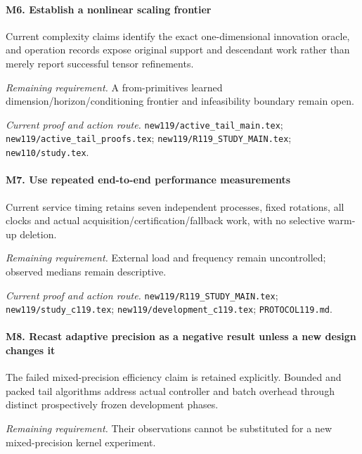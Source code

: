 \paragraph{M6. Establish a nonlinear scaling frontier}

Current complexity claims identify the exact one-dimensional innovation oracle, and operation records expose original support and descendant work rather than merely report successful tensor refinements.

\par\emph{Remaining requirement.} A from-primitives learned dimension/\allowbreak{}horizon/\allowbreak{}conditioning frontier and infeasibility boundary remain open.

\par\emph{Current proof and action route.} \nolinkurl{new119/active_tail_main.tex}; \nolinkurl{new119/active_tail_proofs.tex}; \nolinkurl{new119/R119_STUDY_MAIN.tex}; \nolinkurl{new110/study.tex}.

\paragraph{M7. Use repeated end-to-end performance measurements}

Current service timing retains seven independent processes, fixed rotations, all clocks and actual acquisition/\allowbreak{}certification/\allowbreak{}fallback work, with no selective warm-up deletion.

\par\emph{Remaining requirement.} External load and frequency remain uncontrolled; observed medians remain descriptive.

\par\emph{Current proof and action route.} \nolinkurl{new119/R119_STUDY_MAIN.tex}; \nolinkurl{new119/study_c119.tex}; \nolinkurl{new119/development_c119.tex}; \nolinkurl{PROTOCOL119.md}.

\paragraph{M8. Recast adaptive precision as a negative result unless a new design changes it}

The failed mixed-precision efficiency claim is retained explicitly. Bounded and packed tail algorithms address actual controller and batch overhead through distinct prospectively frozen development phases.

\par\emph{Remaining requirement.} Their observations cannot be substituted for a new mixed-precision kernel experiment.

